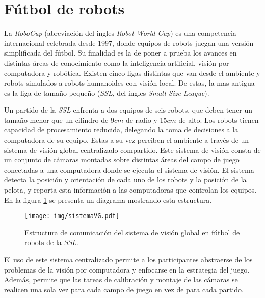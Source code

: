 
\section{Fútbol de robots}

La \emph{RoboCup} (abreviación del ingles \emph{Robot World Cup}) es una
competencia internacional celebrada desde 1997, donde equipos de robots juegan
una versión simplificada del fútbol. Su finalidad es la de poner a prueba los
avances en distintas áreas de conocimiento como la inteligencia artificial,
visión por computadora y robótica. Existen cinco ligas distintas que van desde
el ambiente y robots simulados a robots humanoides con visión local. De estas,
la mas antigua es la liga de tamaño pequeño (\emph{SSL}, del ingles \emph{Small
Size League}).

Un partido de la \emph{SSL} enfrenta a dos equipos de seis robots, que deben
tener un tamaño menor que un cilindro de 9$cm$ de radio y 15$cm$ de
alto\cite{sslrules2015}. Los robots tienen capacidad de procesamiento reducida,
delegando la toma de decisiones a la computadora de su equipo. Estas a su vez
perciben el ambiente a través de un sistema de visión global centralizado
compartido. Este sistema de visión consta de un conjunto de cámaras montadas
sobre distintas áreas del campo de juego conectadas a una computadora donde se
ejecuta el sistema de visión. El sistema detecta la posición y orientación de
cada uno de los robots y la posición de la pelota, y reporta esta información a
las computadoras que controlan los equipos. En la figura \ref{sistemaVG} se
presenta un diagrama mostrando esta estructura.

\begin{figure}[!h]

	\texttt{[image: img/sistemaVG.pdf]}
	\caption{Estructura de comunicación del sistema de visión global en
	fútbol de robots de la \emph{SSL}.}
	\label{sistemaVG}

\end{figure}

El uso de este sistema centralizado permite a los participantes abstraerse de
los problemas de la visión por computadora y enfocarse en la estrategia del
juego. Además, permite que las tareas de calibración y montaje de las cámaras se
realicen una sola vez para cada campo de juego en vez de para cada partido.

